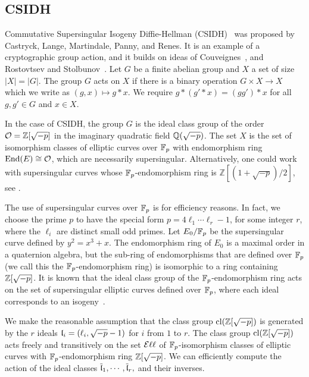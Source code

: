 
\subsection{CSIDH\label{sec:CSIDH}}


Commutative Supersingular Isogeny Diffie-Hellman (CSIDH)~\cite{CSIDH} was proposed by Castryck, Lange, Martindale, Panny, and Renes. It is an example of a cryptographic group action, and it builds on ideas of Couveignes~\cite{Couv06}, and Rostovtsev and Stolbunov~\cite{RosSto}.
Let $G$ be a finite abelian group and $X$ a set of size $|X|=|G|$. The group $G$ acts on $X$ if there is a binary operation $G \times X \to X$ which we write as $(g,x) \mapsto g*x$. We require $g*( g'*x) = (gg')*x$ for all $g, g' \in G$ and $x \in X$.

In the case of CSIDH, the group $G$ is the ideal class group of the order $\mathcal{O} = \mathbb{Z}[\sqrt{-p}]$ in  the imaginary quadratic field $\mathbb{Q}( \sqrt{-p} )$.
The set $X$ is the set of isomorphism classes of elliptic  curves over $\mathbb{F}_p$ with endomorphism ring $\text{End}(E) \cong \mathcal{O}$, which are necessarily supersingular.
Alternatively, one could work with supersingular curves whose $\mathbb{F}_p$-endomorphism ring is $\mathbb{Z}[(1+\sqrt{-p})/2]$, see \cite{CD20}.


The use of supersingular curves over $\mathbb{F}_p$ is for efficiency reasons.
In fact, we choose the prime $p$ to have the special form $p = 4\ell_1 \cdots \ell_r -1$, for some integer $r$, where the $\ell_i$ are distinct small odd primes.
Let $E_0/\mathbb{F}_p$ be the supersingular curve defined by $y^2 = x^3 + x$. 
The endomorphism ring of $E_0$ is a maximal order in a quaternion algebra, but  the sub-ring of endomorphisms that are defined over $\mathbb{F}_p$ (we call this the $\mathbb{F}_p$-endomorphism ring) is isomorphic to a ring containing $\mathbb{Z}[\sqrt{-p}]$. 
It is known that the ideal class group of the $\mathbb{F}_p$-endomorphism ring acts on the set of supersingular elliptic curves defined over $\mathbb{F}_p$, where each ideal corresponds to an isogeny~\cite{Waterhouse}.

We make the reasonable assumption that the class group $\text{cl}(\mathbb{Z}[\sqrt{-p}])$ is generated by the $r$ ideals $\mathfrak{l}_i = (\ell_i, \sqrt{-p} - 1)$ for $i$ from $1$ to $r$.
The class group $\text{cl}(\mathbb{Z}[\sqrt{-p}])$ acts freely and transitively on the set $\mathcal{E}\ell\ell$ of $\mathbb{F}_p$-isomorphism classes of elliptic curves with $\mathbb{F}_p$-endomorphism ring $\mathbb{Z}[\sqrt{-p}]$. We can efficiently compute the action of the ideal classes $\overline{\mathfrak{l}}_1,\cdots,\overline{\mathfrak{l}}_r,$ and their inverses.

